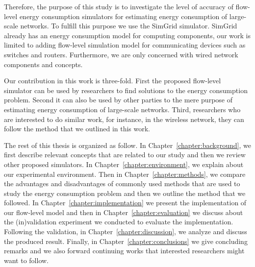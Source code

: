 Therefore, the purpose of this study is to investigate the level of accuracy of flow-level energy consumption simulators for estimating energy consumption of large-scale networks. To fulfill this purpose we use the SimGrid simulator. SimGrid already has an energy consumption model for computing components, our work is limited to adding flow-level simulation model for communicating devices such as switches and routers. Furthermore, we are only concerned with wired network components and concepts. 

Our contribution in this work is three-fold. First the proposed flow-level simulator can be used by researchers to find solutions to the energy consumption problem. Second it can also be used by other parties to the mere purpose of estimating energy consumption of large-scale networks. Third, researchers who are interested to do similar work, for instance, in the wireless network, they can follow the method that we outlined in this work.  

The rest of this thesis is organized as follow. In Chapter~\ref{chapter:background}, we first describe relevant concepts that are related to our study and then we review other proposed simulators. In Chapter~\ref{chapter:environment}, we explain about our experimental environment. Then in Chapter~\ref{chapter:methods}, we compare the advantages and disadvantages of commonly used methods that are used to study the energy consumption problem and then we outline the method that we followed. In Chapter~\ref{chapter:implementation} we present the implementation of our flow-level model and then in Chapter~\ref{chapter:evaluation} we discuss about the (in)validation experiment we conducted to evaluate the implementation. Following the validation, in Chapter~\ref{chapter:discussion}, we analyze and discuss the produced result. Finally, in Chapter~\ref{chapter:conclusions} we give concluding remarks and we also forward continuing works that interested researchers might want to follow.


